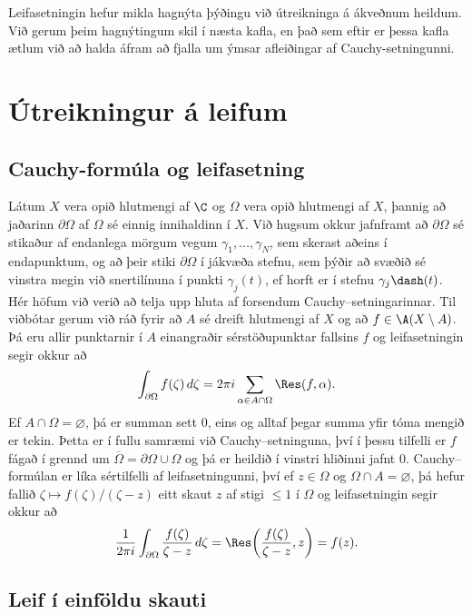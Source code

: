 \medskip
Leifasetningin hefur mikla hagnýta þýðingu við útreikninga á ákveðnum
heild\-um.  Við gerum þeim hagnýtingum skil í næsta kafla, en það 
sem eftir er þessa kafla ætlum við að halda áfram að fjalla um ýmsar
afleiðingar af Cauchy-setningunni.




\section{Útreikningur á leifum}


\subsection*{Cauchy-formúla og leifasetning}


Látum $X$ vera opið hlutmengi af $\C$ og $\Omega$ vera opið hlutmengi
af $X$, þannig að jaðarinn $\partial\Omega$ af $\Omega$ sé einnig
innihaldinn í $X$.  Við hugsum okkur jafnframt að $\partial\Omega$ sé
stikaður af endanlega mörgum vegum $\gamma_1,\dots,\gamma_N$, sem
skerast aðeins í endapunktum, og að þeir stiki $\partial\Omega$ í
jákvæða stefnu, sem þýðir að svæðið sé vinstra megin við snertilínuna
í punkti $\gamma_j(t)$, ef horft er í stefnu $\gamma_j\dash(t)$.  Hér
höfum við verið að telja upp hluta af forsendum Cauchy--setningarinnar.  Til
viðbótar gerum við ráð fyrir að $A$ sé dreift hlutmengi af $X$  og að
$f\in \A(X\setminus A)$.  Þá eru allir punktarnir í $A$ einangraðir
sérstöðupunktar fallsins $f$ og leifasetningin segir okkur að
 \begin{equation*}\int _{\partial {\Omega}} f(\zeta)\, d\zeta =2\pi i
\sum\limits_{\alpha\in A\cap \Omega}
\Res (f,\alpha).\label{11.1.1}
 \end{equation*}
Ef $A\cap \Omega=\varnothing$, þá er summan sett $0$, eins og alltaf
þegar summa yfir tóma mengið er tekin.  Þetta er í fullu samræmi við
Cauchy--setninguna, því í þessu tilfelli er $f$ fágað í grennd um
$\overline\Omega=\partial\Omega\cup \Omega$ og þá er heildið í
vinstri hliðinni jafnt $0$.   Cauchy--formúlan er líka sértilfelli af
leifasetningunni, því ef $z\in \Omega$ og $\Omega\cap A=\varnothing$,
þá hefur fallið $\zeta\mapsto f(\zeta)/(\zeta-z)$ eitt skaut $z$ af
 stigi $\leq 1$ í $\Omega$ og leifasetningin segir okkur að
 $$\dfrac 1{2\pi i}\int_{\partial\Omega} \dfrac{f(\zeta)}{\zeta-z}\,
d\zeta = \Res \bigg( \dfrac{f(\zeta)}{\zeta-z},z\bigg)=f(z).
 $$

\subsection*{Leif í einföldu skauti}

